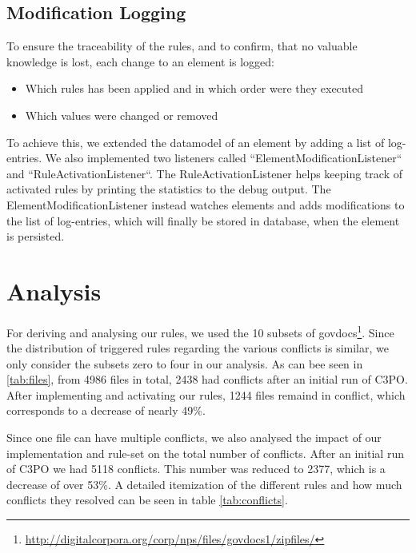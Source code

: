 \documentclass[a4paper,12pt]{article}
\begin{document}
\subsection{Modification Logging}

To ensure the traceability of the rules, and to confirm, that no valuable knowledge is lost, each change to an element is logged:
\begin{itemize}
\item Which rules has been applied and in which order were they executed
\item Which values were changed or removed
\end{itemize}

To achieve this, we extended the datamodel of an element by adding a list of log-entries. We also implemented two listeners called ``ElementModificationListener`` and ``RuleActivationListener``. The RuleActivationListener helps keeping track of activated rules by printing the statistics to the debug output.
The ElementModificationListener instead watches elements and adds modifications to the list of log-entries, which will finally be stored in database, when the element is persisted.


\section{Analysis}

For deriving and analysing our rules, we used the 10 subsets of govdocs\footnote{\url{http://digitalcorpora.org/corp/nps/files/govdocs1/zipfiles/}}.
Since the distribution of triggered rules regarding the various conflicts is similar, we only consider the subsets zero to four in our analysis.
As can bee seen in \ref{tab:files}, from 4986 files in total, 2438 had conflicts after an initial run of C3PO. After implementing and activating our rules, 1244 files remaind in conflict, which corresponds to a decrease of nearly 49\%.

Since one file can have multiple conflicts, we also analysed the impact of our implementation and rule-set on the total number of conflicts.
After an initial run of C3PO we had 5118 conflicts. This number was reduced to 2377, which is a decrease of over 53\%.
A detailed itemization of the different rules and how much conflicts they resolved can be seen in table \ref{tab:conflicts}.
\end{document}
